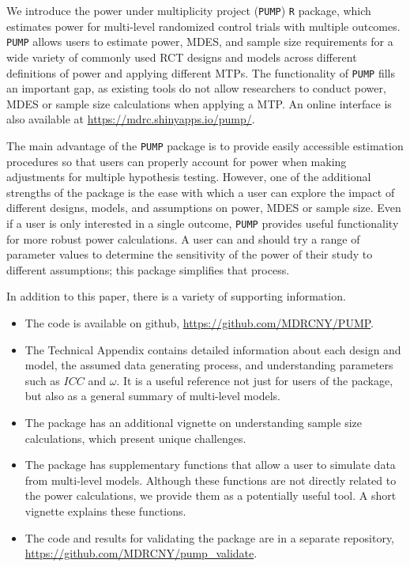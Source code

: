 \documentclass[
]{article}
\providecommand{\tightlist}{%
  \setlength{\itemsep}{0pt}\setlength{\parskip}{0pt}}
\begin{document}
We introduce the power under multiplicity project (\texttt{PUMP})
\texttt{R} package, which estimates power for multi-level randomized
control trials with multiple outcomes. \texttt{PUMP} allows users to
estimate power, MDES, and sample size requirements for a wide variety of
commonly used RCT designs and models across different definitions of
power and applying different MTPs. The functionality of \texttt{PUMP}
fills an important gap, as existing tools do not allow researchers to
conduct power, MDES or sample size calculations when applying a MTP. An
online interface is also available at
\url{https://mdrc.shinyapps.io/pump/}.

The main advantage of the \texttt{PUMP} package is to provide easily
accessible estimation procedures so that users can properly account for
power when making adjustments for multiple hypothesis testing. However,
one of the additional strengths of the package is the ease with which a
user can explore the impact of different designs, models, and
assumptions on power, MDES or sample size. Even if a user is only
interested in a single outcome, \texttt{PUMP} provides useful
functionality for more robust power calculations. A user can and should
try a range of parameter values to determine the sensitivity of the
power of their study to different assumptions; this package simplifies
that process.

In addition to this paper, there is a variety of supporting information.

\begin{itemize}
\tightlist
\item
  The code is available on github, \url{https://github.com/MDRCNY/PUMP}.
\item
  The Technical Appendix contains detailed information about each design
  and model, the assumed data generating process, and understanding
  parameters such as \(ICC\) and \(\omega\). It is a useful reference
  not just for users of the package, but also as a general summary of
  multi-level models.
\item
  The package has an additional vignette on understanding sample size
  calculations, which present unique challenges.
\item
  The package has supplementary functions that allow a user to simulate
  data from multi-level models. Although these functions are not
  directly related to the power calculations, we provide them as a
  potentially useful tool. A short vignette explains these functions.
\item
  The code and results for validating the package are in a separate
  repository, \url{https://github.com/MDRCNY/pump_validate}.
\end{itemize}
\end{document}
